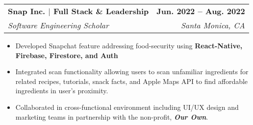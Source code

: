 \documentclass[letterpaper,11pt]{article}
\makeatletter
\newcommand{\resumeItem}[1]{
  \item\small{
    {#1 \vspace{-2pt}}
  }
}
\newcommand{\resumeSubheading}[4]{
  \vspace{-2pt}\item
    \begin{tabular*}{1.0\textwidth}[t]{l@{\extracolsep{\fill}}r}
      \textbf{#1} & \textbf{\small #2} \\
      \textit{\small#3} & \textit{\small #4} \\
    \end{tabular*}\vspace{-7pt}
}
\newcommand{\resumeItemListStart}{\begin{itemize}}
\newcommand{\resumeItemListEnd}{\end{itemize}\vspace{-5pt}}
\makeatother
\begin{document}


\resumeSubheading
{Snap Inc. $|$ Full Stack \& Leadership}{ Jun. 2022 -- Aug. 2022}
{Software Engineering Scholar}{Santa Monica, CA}
\resumeItemListStart
\resumeItem {
Developed Snapchat feature addressing food-security using \textbf{React-Native, Firebase, Firestore, and Auth}}
\resumeItem{ Integrated scan functionality allowing users to scan unfamiliar ingredients for related recipes, tutorials, snack facts, and Apple Maps API to find affordable ingredients in user's proximity.}
\resumeItem{
Collaborated in cross-functional environment including UI/UX design and marketing teams in partnership with the non-profit, \textbf{\textit{Our Own}}. }
\resumeItemListEnd





\end{document}
